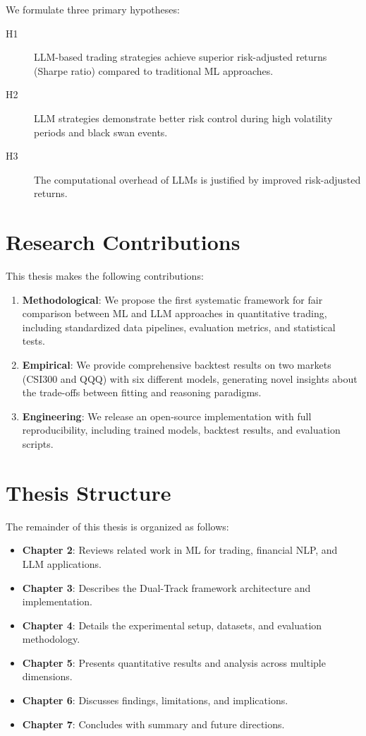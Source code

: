 We formulate three primary hypotheses:

\begin{description}
    \item[H1] LLM-based trading strategies achieve superior risk-adjusted returns (Sharpe ratio) compared to traditional ML approaches.
    \item[H2] LLM strategies demonstrate better risk control during high volatility periods and black swan events.
    \item[H3] The computational overhead of LLMs is justified by improved risk-adjusted returns.
\end{description}

\section{Research Contributions}

This thesis makes the following contributions:

\begin{enumerate}
    \item \textbf{Methodological}: We propose the first systematic framework for fair comparison between ML and LLM approaches in quantitative trading, including standardized data pipelines, evaluation metrics, and statistical tests.

    \item \textbf{Empirical}: We provide comprehensive backtest results on two markets (CSI300 and QQQ) with six different models, generating novel insights about the trade-offs between fitting and reasoning paradigms.

    \item \textbf{Engineering}: We release an open-source implementation with full reproducibility, including trained models, backtest results, and evaluation scripts.
\end{enumerate}

\section{Thesis Structure}

The remainder of this thesis is organized as follows:

\begin{itemize}
    \item \textbf{Chapter 2}: Reviews related work in ML for trading, financial NLP, and LLM applications.
    \item \textbf{Chapter 3}: Describes the Dual-Track framework architecture and implementation.
    \item \textbf{Chapter 4}: Details the experimental setup, datasets, and evaluation methodology.
    \item \textbf{Chapter 5}: Presents quantitative results and analysis across multiple dimensions.
    \item \textbf{Chapter 6}: Discusses findings, limitations, and implications.
    \item \textbf{Chapter 7}: Concludes with summary and future directions.
\end{itemize}